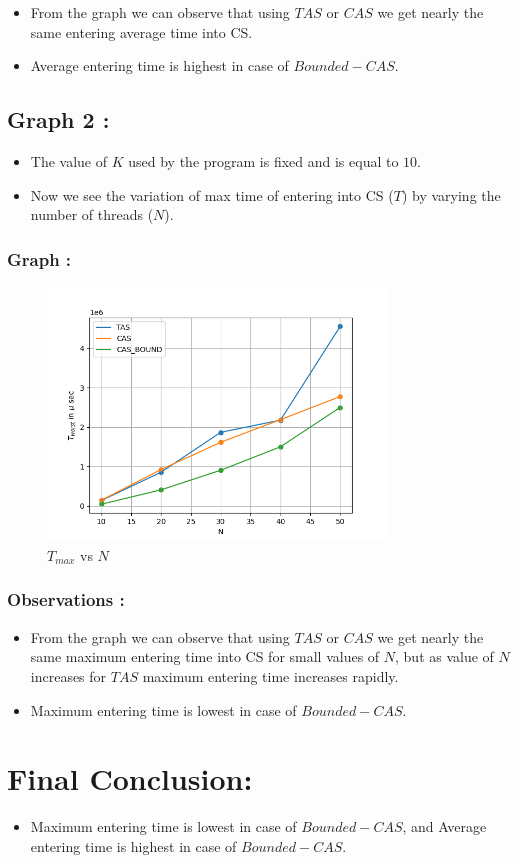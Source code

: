 \documentclass[12pt,a4paper]{article}
\begin{document}
		\begin{itemize}
			\item From the graph we can observe that using $TAS$ or $CAS$ we get nearly the same entering average time into CS.
			\item Average entering time is highest in case of $Bounded-CAS$.
		\end{itemize}

	\subsection{ Graph 2 :}
	\begin{itemize}
		\item The value of $K$ used by the program is fixed and is equal to $10$.
		\item Now we see the variation of max time of entering into CS ($T$) by varying the number of threads ($N$).
	\end{itemize}
	\subsubsection{Graph :}
	\begin{figure}[H]
		\centering
		\includegraphics[width=0.8\textwidth]{worst.png}
		\caption{$T_{max}$ vs $N$ }
	\end{figure}
	\subsubsection{Observations :} 

		\begin{itemize}
	\item From the graph we can observe that using $TAS$ or $CAS$ we get nearly the same maximum entering time into CS for small values of $N$, but as value of $N$ increases for $TAS$ maximum entering time increases rapidly.
	\item Maximum entering time is lowest in case of $Bounded-CAS$.
\end{itemize}

	\section{ Final Conclusion:} 
	\begin{itemize}
		\item Maximum entering time is lowest in case of $Bounded-CAS$, and Average entering time is highest in case of $Bounded-CAS$.
	\end{itemize}
\end{document}
